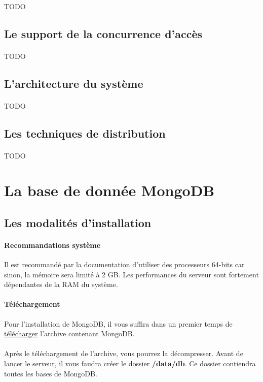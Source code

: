 \documentclass{article}
\begin{document}
  \paragraph{} TODO
\subsection{Le support de la concurrence d’accès}
  \paragraph{} TODO
\subsection{L’architecture du système}
  \paragraph{} TODO
\subsection{Les techniques de distribution}
  \paragraph{} TODO
  
  
  
\newpage
\section{La base de donnée MongoDB}
\subsection{Les modalités d’installation}
  \paragraph{Recommandations système} 
    Il est recommandé par la documentation d'utiliser des processeurs 64-bits car sinon,
    la mémoire sera limité à 2 GB.
    Les performances du serveur sont fortement dépendantes de la RAM du système.
  \paragraph{Téléchargement} Pour l'installation de MongoDB, il vous suffira
  dans un premier temps de \href{https://www.mongodb.com/download-center#community}{télécharger} 
  l'archive contenant MongoDB.
  \paragraph{} Après le téléchargement de l'archive, vous pourrez la décompresser. Avant
  de lancer le serveur, il vous faudra créer le dossier \textbf{/data/db}. Ce dossier
  contiendra toutes les bases de MongoDB.
\end{document}
